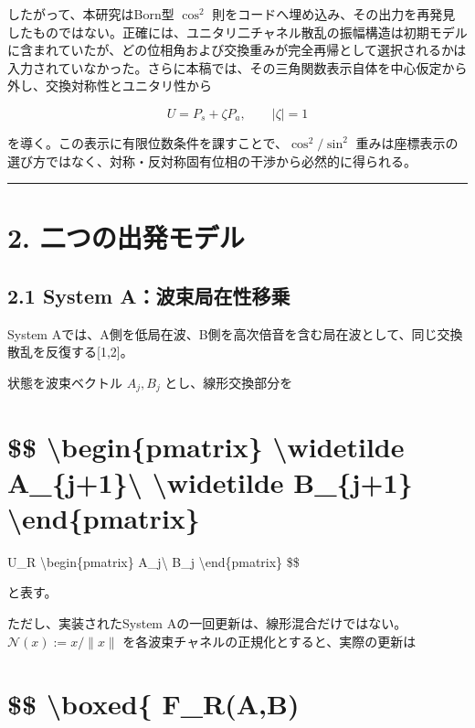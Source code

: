 \documentclass[
  a4paper,
  10pt]{article}
\begin{document}
したがって、本研究はBorn型 \(\cos^2\)
則をコードへ埋め込み、その出力を再発見したものではない。正確には、ユニタリ二チャネル散乱の振幅構造は初期モデルに含まれていたが、どの位相角および交換重みが完全再帰として選択されるかは入力されていなかった。さらに本稿では、その三角関数表示自体を中心仮定から外し、交換対称性とユニタリ性から

\[
U=P_s+\zeta P_a,
\qquad |\zeta|=1
\]

を導く。この表示に有限位数条件を課すことで、\(\cos^2/\sin^2\)
重みは座標表示の選び方ではなく、対称・反対称固有位相の干渉から必然的に得られる。

\begin{center}\rule{0.5\linewidth}{0.5pt}\end{center}

\section{2.
二つの出発モデル}\label{2-ux4e8cux3064ux306eux51faux767aux30e2ux30c7ux30eb}

\subsection{2.1 System
A：波束局在性移乗}\label{21-system-aux6ce2ux675fux5c40ux5728ux6027ux79fbux4e57}

System
Aでは、A側を低局在波、B側を高次倍音を含む局在波として、同じ交換散乱を反復する{[}1,2{]}。

状態を波束ベクトル \(A_j,B_j\) とし、線形交換部分を

\section{\$\$ \textbackslash begin\{pmatrix\} \textbackslash widetilde
A\_\{j+1\}\textbackslash{} \textbackslash widetilde B\_\{j+1\}
\textbackslash end\{pmatrix\}}\label{-beginpmatrix-widetilde-a_j1-widetilde-b_j1-endpmatrix}

U\_R \textbackslash begin\{pmatrix\} A\_j\textbackslash{} B\_j
\textbackslash end\{pmatrix\} \$\$

と表す。

ただし、実装されたSystem
Aの一回更新は、線形混合だけではない。\(\mathcal N(x):=x/\|x\|\)
を各波束チャネルの正規化とすると、実際の更新は

\section{\$\$ \textbackslash boxed\{ F\_R(A,B)}\label{-boxed-f_rab}
\end{document}
